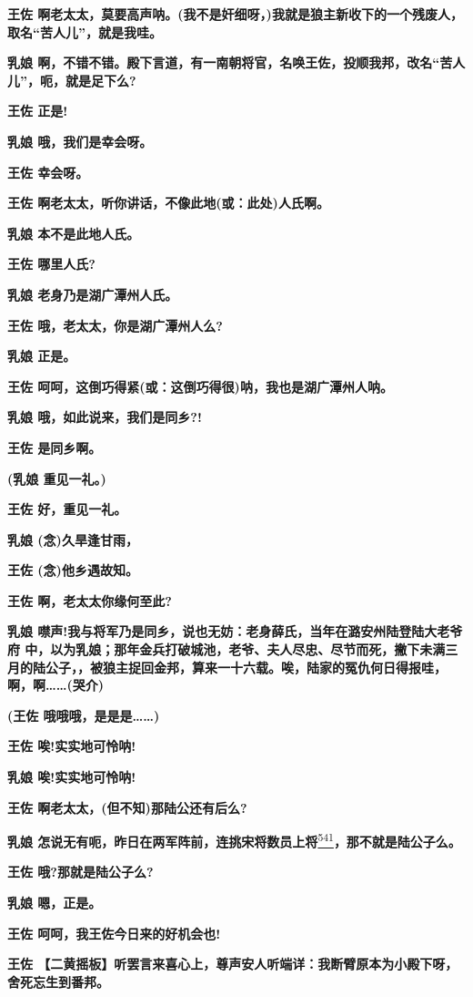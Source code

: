\textbf{王佐
啊老太太，莫要高声呐。(我不是奸细呀，)我就是狼主新收下的一个残废人，
取名``苦人儿''，就是我哇。}

\textbf{乳娘
啊，不错不错。殿下言道，有一南朝将官，名唤王佐，投顺我邦，改名``苦人
儿''，呃，就是足下么?}

\textbf{王佐 正是!}

\textbf{乳娘 哦，我们是幸会呀。}

\textbf{王佐 幸会呀。}

\textbf{王佐 啊老太太，听你讲话，不像此地(或：此处)人氏啊。}

\textbf{乳娘 本不是此地人氏。}

\textbf{王佐 哪里人氏?}

\textbf{乳娘 老身乃是湖广潭州人氏。}

\textbf{王佐 哦，老太太，你是湖广潭州人么?}

\textbf{乳娘 正是。}

\textbf{王佐 呵呵，这倒巧得紧(或：这倒巧得很)呐，我也是湖广潭州人呐。}

\textbf{乳娘 哦，如此说来，我们是同乡?!}

\textbf{王佐 是同乡啊。}

\textbf{(乳娘 重见一礼。)}

\textbf{王佐 好，重见一礼。}

\textbf{乳娘 (念)久旱逢甘雨，}

\textbf{王佐 (念)他乡遇故知。}

\textbf{王佐 啊，老太太你缘何至此?}

\textbf{乳娘
噤声!我与将军乃是同乡，说也无妨：老身薛氏，当年在潞安州陆登陆大老爷府
中，以为乳娘；那年金兵打破城池，老爷、夫人尽忠、尽节而死，撇下未满三
月的陆公子，，被狼主捉回金邦，算来一十六载。唉，陆家的冤仇何日得报哇，
啊，啊\ldots{}\ldots{}(哭介)}

\textbf{(王佐 哦哦哦，是是是\ldots{}\ldots{})}

\textbf{王佐 唉!实实地可怜呐!}

\textbf{乳娘 唉!实实地可怜呐!}

\textbf{王佐 啊老太太，(但不知)那陆公还有后么?}

\textbf{乳娘
怎说无有呃，昨日在两军阵前，连挑宋将数员上将}\protect\hyperlink{fn541}{\textsuperscript{541}}\textbf{，那不就是陆公子么。}

\textbf{王佐 哦?那就是陆公子么?}

\textbf{乳娘 嗯，正是。}

\textbf{王佐 呵呵，我王佐今日来的好机会也!}

\textbf{王佐
【二黄摇板】听罢言来喜心上，尊声安人听端详：我断臂原本为小殿下呀，舍死忘生到番邦。}

